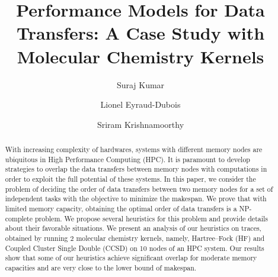\documentclass[sigconf]{acmart}
\begin{document}
	
	\title{Performance Models for Data Transfers: A Case Study with Molecular Chemistry Kernels}
	
	\author{Suraj Kumar}
	
	
	
	\author{Lionel Eyraud-Dubois}
	
	\author{Sriram Krishnamoorthy}
	
	\renewcommand{\shortauthors}{Kumar and Eyraud-Dubois, et al.}
	
	
	\begin{abstract}
		With increasing complexity of hardwares, systems with different memory nodes are ubiquitous in High Performance Computing (HPC). It is paramount to develop strategies to overlap the data transfers between memory nodes with computations in order to exploit the full potential of these systems. In this paper, we consider the problem of deciding the order of data transfers between two memory nodes for a set of independent tasks with the objective to minimize the makespan. We prove that with limited memory capacity, obtaining the optimal order of data transfers is a NP-complete problem. We propose several heuristics for this problem and provide details about their favorable situations. We present an analysis of our heuristics on traces, obtained by running 2 molecular chemistry kernels, namely, Hartree–Fock (HF) and Coupled Cluster Single Double (CCSD) on 10 nodes of an HPC system. Our results show that some of our heuristics achieve significant overlap for moderate memory capacities and are very close to the lower bound of makespan.
	\end{abstract}
	
\end{document}
